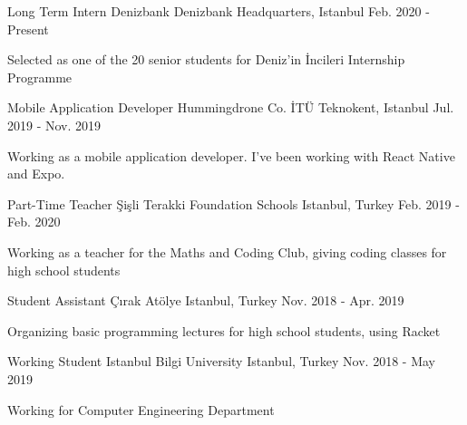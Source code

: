 

\begin{cventries}
\cventry
{Long Term Intern} %
{Denizbank} %
{Denizbank Headquarters, Istanbul} %
{Feb. 2020 - Present} %
{ %
\begin{cvitems}
\item {Selected as one of the 20 senior students for Deniz'in İncileri Internship Programme}
\end{cvitems}
}


\cventry
{Mobile Application Developer} %
{Hummingdrone Co.} %
{İTÜ Teknokent, Istanbul} %
{Jul. 2019 - Nov. 2019} %
{ %
\begin{cvitems}
\item {Working as a mobile application developer. I've been working with React Native and Expo.}
\end{cvitems}
}


\cventry
{Part-Time Teacher} %
{Şişli Terakki Foundation Schools} %
{Istanbul, Turkey} %
{Feb. 2019 - Feb. 2020} %
{ %
\begin{cvitems}
\item {Working as a teacher for the Maths and Coding Club, giving coding classes for high school students}
\end{cvitems}
}


\cventry
{Student Assistant} %
{Çırak Atölye} %
{Istanbul, Turkey} %
{Nov. 2018 - Apr. 2019} %
{ %
\begin{cvitems}
\item {Organizing basic programming lectures for high school students, using Racket}
\end{cvitems}
}


\cventry
{Working Student} %
{Istanbul Bilgi University} %
{Istanbul, Turkey} %
{Nov. 2018 - May 2019} %
{ %
\begin{cvitems}
\item {Working for Computer Engineering Department}
\end{cvitems}
}

\end{cventries}